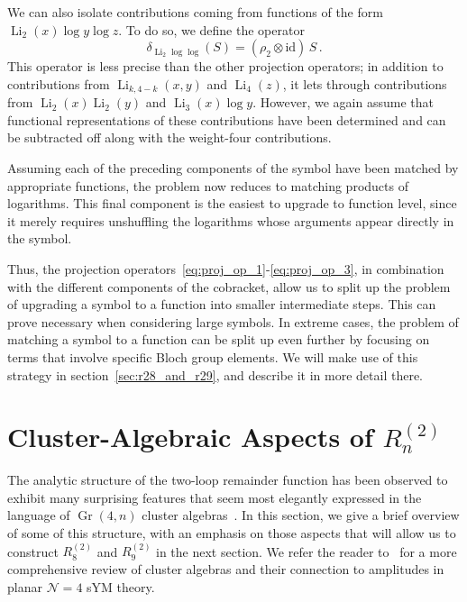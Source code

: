 \documentclass[11pt]{article}
\DeclareMathOperator{\Gr}{Gr}
\DeclareMathOperator{\Li}{Li}
\def\pdfeq#1{\texorpdfstring{$#1$}{a}}
\begin{document}
We can also isolate contributions coming from functions of the form $\Li_2(x) \log y  \log z$. To do so, we define the operator
\begin{equation}
\delta_{\Li_2 \log \log} (S)= (\rho_2 \otimes \text{id})\, S \, . \label{eq:proj_op_3}
\end{equation}
This operator is less precise than the other projection operators; in addition to contributions from $\Li_{k,4-k}(x,y)$ and $\Li_4(z)$, it lets through contributions from $\Li_2(x) \Li_2(y)$ and $\Li_3(x) \log y$. However, we again assume that functional representations of these contributions have been determined and can be subtracted off along with the weight-four contributions. 

Assuming each of the preceding components of the symbol have been matched by appropriate functions, the problem now reduces to matching products of logarithms. This final component is the easiest to upgrade to function level, since it merely requires unshuffling the logarithms whose arguments appear directly in the symbol.  
 
Thus, the projection operators~\eqref{eq:proj_op_1}-\eqref{eq:proj_op_3}, in combination with the different components of the cobracket, allow us to split up the problem of upgrading a symbol to a function into smaller intermediate steps. This can prove necessary when considering large symbols. In extreme cases, the problem of matching a symbol to a function can be split up even further by focusing on terms that involve specific Bloch group elements. We will make use of this strategy in section~\ref{sec:r28_and_r29}, and describe it in more detail there. 


\section{Cluster-Algebraic Aspects of \pdfeq{R_n^{(2)}}}
\label{sec:cluster_algebraic_structure}

The analytic structure of the two-loop remainder function has been observed to exhibit many surprising features that seem most elegantly expressed in the language of $\Gr(4,n)$ cluster algebras~\cite{1021.16017}.  In this section, we give a brief overview of some of this structure, with an emphasis on those aspects that will allow us to construct $R_8^{(2)}$\! and $R_9^{(2)}$\! in the next section. We refer the reader to~\cite{Golden:2018gtk} for a more comprehensive review of cluster algebras and their connection to amplitudes in planar $\mathcal{N} = 4$ sYM theory. 
\end{document}
